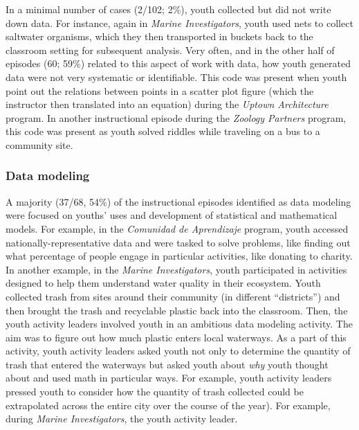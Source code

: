\documentclass[]{msu-thesis}
\theoremstyle{definition}
\theoremstyle{definition}
\theoremstyle{definition}
\theoremstyle{remark}
\begin{document}
In a minimal number of cases (2/102; 2\%), youth collected but did not
write down data. For instance, again in \emph{Marine Investigators},
youth used nets to collect saltwater organisms, which they then
transported in buckets back to the classroom setting for subsequent
analysis. Very often, and in the other half of episodes (60; 59\%)
related to this aspect of work with data, how youth generated data were
not very systematic or identifiable. This code was present when youth
point out the relations between points in a scatter plot figure (which
the instructor then translated into an equation) during the \emph{Uptown
Architecture} program. In another instructional episode during the
\emph{Zoology Partners} program, this code was present as youth solved
riddles while traveling on a bus to a community site.

\subsubsection{Data modeling}\label{data-modeling}

A majority (37/68, 54\%) of the instructional episodes identified as
data modeling were focused on youths' uses and development of
statistical and mathematical models. For example, in the \emph{Comunidad
de Aprendizaje} program, youth accessed nationally-representative data
and were tasked to solve problems, like finding out what percentage of
people engage in particular activities, like donating to charity. In
another example, in the \emph{Marine Investigators}, youth participated
in activities designed to help them understand water quality in their
ecosystem. Youth collected trash from sites around their community (in
different ``districts'') and then brought the trash and recyclable
plastic back into the classroom. Then, the youth activity leaders
involved youth in an ambitious data modeling activity. The aim was to
figure out how much plastic enters local waterways. As a part of this
activity, youth activity leaders asked youth not only to determine the
quantity of trash that entered the waterways but asked youth about
\emph{why} youth thought about and used math in particular ways. For
example, youth activity leaders pressed youth to consider how the
quantity of trash collected could be extrapolated across the entire city
over the course of the year). For example, during \emph{Marine
Investigators}, the youth activity leader.
\end{document}
